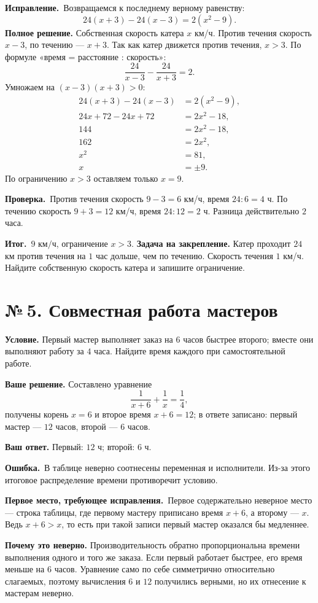 \documentclass[a4paper,12pt]{article}
\newcommand{\errlabel}{\textcolor{err}{\textbf{Ошибка.}}}
\newcommand{\resultlabel}{\textcolor{accent}{\textbf{Итог.}}}
\newcommand{\reviewtask}[2]{\clearpage\phantomsection\label{task:#1}\section*{\textcolor{accent}{№\,#1. #2}}}
\newcommand{\firstwrong}{\textbf{Первое место, требующее исправления.}}
\newcommand{\fix}{\textbf{Исправление.}}
\newcommand{\verify}{\textbf{Проверка.}}
\newcommand{\practice}{\medskip\textbf{Задача на закрепление.} }
\begin{document}
\fix\ Возвращаемся к последнему верному равенству:
\[
24(x+3)-24(x-3)=2(x^2-9).
\]
\textbf{Полное решение.} Собственная скорость катера $x$ км/ч. Против течения скорость $x-3$, по течению --- $x+3$. Так как катер движется против течения, $x>3$. По формуле «время = расстояние : скорость»:
\[
\frac{24}{x-3}-\frac{24}{x+3}=2.
\]
Умножаем на $(x-3)(x+3)>0$:
\begin{align*}
24(x+3)-24(x-3)&=2(x^2-9),\\
24x+72-24x+72&=2x^2-18,\\
144&=2x^2-18,\\
162&=2x^2,\\
x^2&=81,\\
x&=\pm9.
\end{align*}
По ограничению $x>3$ оставляем только $x=9$.

\verify\ Против течения скорость $9-3=6$ км/ч, время $24:6=4$ ч. По течению скорость $9+3=12$ км/ч, время $24:12=2$ ч. Разница действительно $2$ часа.

\resultlabel\ $\boxed{9\text{ км/ч}}$, ограничение $\boxed{x>3}$.
\practice Катер проходит $24$ км против течения на $1$ час дольше, чем по течению. Скорость течения $1$ км/ч. Найдите собственную скорость катера и запишите ограничение.

\reviewtask{5}{Совместная работа мастеров}
\textbf{Условие.} Первый мастер выполняет заказ на $6$ часов быстрее второго; вместе они выполняют работу за $4$ часа. Найдите время каждого при самостоятельной работе.

\textbf{Ваше решение.} Составлено уравнение
\[
\frac1{x+6}+\frac1x=\frac14,
\]
получены корень $x=6$ и второе время $x+6=12$; в ответе записано: первый мастер --- $12$ часов, второй --- $6$ часов.

\textbf{Ваш ответ.} Первый: $12$ ч; второй: $6$ ч.

\errlabel\ В таблице неверно соотнесены переменная и исполнители. Из-за этого итоговое распределение времени противоречит условию.

\firstwrong\ Первое содержательно неверное место --- строка таблицы, где первому мастеру приписано время $x+6$, а второму --- $x$. Ведь $x+6>x$, то есть при такой записи первый мастер оказался бы медленнее.

\textbf{Почему это неверно.} Производительность обратно пропорциональна времени выполнения одного и того же заказа. Если первый работает быстрее, его время меньше на $6$ часов. Уравнение само по себе симметрично относительно слагаемых, поэтому вычисления $6$ и $12$ получились верными, но их отнесение к мастерам неверно.
\end{document}
